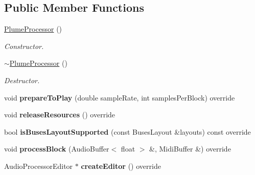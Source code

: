 \subsection*{Public Member Functions}
\begin{DoxyCompactItemize}
\item 
\mbox{\hyperlink{class_plume_processor_a1462b7f98f4677da0dab2d98dd8da1e1}{Plume\+Processor}} ()
\begin{DoxyCompactList}\small\item\em Constructor. \end{DoxyCompactList}\item 
\mbox{\label{class_plume_processor_a3ff1acd929c81502079017721525a2df}} 
\mbox{\hyperlink{class_plume_processor_a3ff1acd929c81502079017721525a2df}{$\sim$\+Plume\+Processor}} ()
\begin{DoxyCompactList}\small\item\em Destructor. \end{DoxyCompactList}\item 
\mbox{\label{class_plume_processor_a86a4085b844401c13d952e3936605b78}} 
void {\bfseries prepare\+To\+Play} (double sample\+Rate, int samples\+Per\+Block) override
\item 
\mbox{\label{class_plume_processor_ac85f0efc3d2dcd25d805c3d096c5fad8}} 
void {\bfseries release\+Resources} () override
\item 
\mbox{\label{class_plume_processor_a8f659b42f6d4f2fe00c9feec53f9f5b7}} 
bool {\bfseries is\+Buses\+Layout\+Supported} (const Buses\+Layout \&layouts) const override
\item 
\mbox{\label{class_plume_processor_aa47e4738eae67255b42533566bca5f6b}} 
void {\bfseries process\+Block} (Audio\+Buffer$<$ float $>$ \&, Midi\+Buffer \&) override
\item 
\mbox{\label{class_plume_processor_ad8a4c43c38f0be73c8c5845a3d42a011}} 
Audio\+Processor\+Editor $\ast$ {\bfseries create\+Editor} () override
\item 
\mbox{\label{class_plume_processor_acd298ef63a793a2a713048a758d6aa7c}} 

\end{DoxyCompactItemize}
